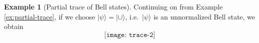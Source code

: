 \documentclass[aps,pra,12pt,nofootinbib,superscriptaddress,longbibliography]{revtex4-1}
\newcommand{\jb}[1]{\todo[inline]{{\textbf{[}JB: #1\textbf{]}}}}
\newcommand{\vb}[1]{}
\theoremstyle{plain}
\theoremstyle{definition}
\newtheorem{example}[theorem]{Example}
\newcommand{\ket}[1]{\mbox{$|#1\rangle$}}
\newcommand{\be}{\begin{equation}}
\newcommand{\ee}{\end{equation}}
\begin{document}
\begin{example}[Partial trace of Bell states] Continuing on from Example \ref{ex:partial-trace}, if we choose $\ket{\psi} = \ket{\cup}$, i.e.~$\ket{\psi}$ is an unnormalized Bell state, we obtain 
\be
\texttt{[image: trace-2]}%
\ee


\end{example}
\end{document}
